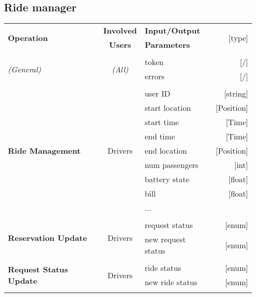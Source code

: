 \subsection{Ride manager}
	\begin{center}
		\begin{tabular}{ l | c | l   r }
			\multirow{2}{*}{\textbf{Operation}} & \textbf{Involved} & \textbf{Input/Output} & \multirow{2}{*}{[type]}\\
			& \textbf{Users} & \textbf{Parameters} & \\ [1.5ex]
			\hline\hline\\
			
			\multirow{2}{*}{\textit{(General)}}
				& \multirow{2}{*}{\textit{(All)}}
					&	token & [/]\\
					&&	errors & [/]\\ [1.5ex]
			\hline\\
			
			\multirow{9}{*}{\textbf{Ride Management}}
				& \multirow{9}{*}{Drivers}
					&	user ID & [string]\\
					&&	start location & [Position]\\
					&&	start time & [Time]\\
					&&	end time & [Time]\\
					&&	end location & [Position]\\
					&&	num passengers & [int]\\
					&&	battery state & [float]\\
					&&	bill & [float]\\
					&&	... & \\ [1.5ex]
			\hline\\
			
			\multirow{2}{*}{\textbf{Reservation Update}}
				& \multirow{2}{*}{Drivers}
					&	request status & [enum]\\
					&&	new request status & [enum]\\ [1.5ex]
			\hline\\
			
			\multirow{2}{*}{\textbf{Request Status Update}}
				& \multirow{2}{*}{Drivers}
					&	ride status & [enum]\\
					&&	new ride status & [enum]\\ [1.5ex]
			\hline\\

		\end{tabular}
	\end{center}

